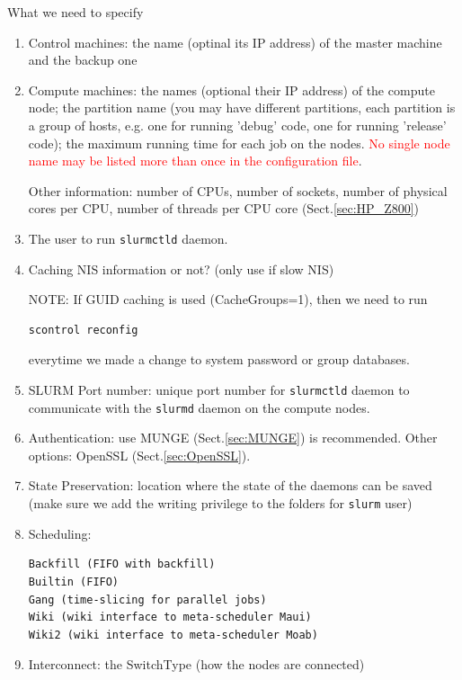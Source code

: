 What we need to specify
\begin{enumerate}
  \item Control machines: the name (optinal its IP address) of the master
  machine and the backup one
  
  \item Compute machines: the names (optional their IP address) of the compute
  node; the partition name (you may have different partitions, each partition is
  a group of hosts, e.g. one for running 'debug' code, one for running 'release'
  code); the maximum running time for each job on the nodes. \textcolor{red}{No
  single node name may be listed more than once in the configuration file}.
  
Other information: number of CPUs, number of sockets, number of physical cores
per CPU, number of threads per CPU core (Sect.\ref{sec:HP_Z800})

  \item The user to run \verb!slurmctld! daemon. 
  
  \item Caching NIS information or not? (only use if slow NIS)

NOTE: If GUID caching is used (CacheGroups=1), then we need to run
\begin{verbatim}
scontrol reconfig
\end{verbatim}
everytime we made a change to system password or group databases. 
  
  \item SLURM Port number: unique port number for \verb!slurmctld! daemon to
  communicate with the \verb!slurmd! daemon on the compute nodes.
  
  \item Authentication: use MUNGE (Sect.\ref{sec:MUNGE}) is recommended. Other
  options: OpenSSL (Sect.\ref{sec:OpenSSL}).
  
  \item State Preservation: location where the state of the daemons can be saved
  (make sure we add the writing privilege to the folders for \verb!slurm! user)
  
  
  \item Scheduling: 
\begin{verbatim}
Backfill (FIFO with backfill)
Builtin (FIFO)
Gang (time-slicing for parallel jobs)
Wiki (wiki interface to meta-scheduler Maui)
Wiki2 (wiki interface to meta-scheduler Moab)
\end{verbatim}

  \item Interconnect: the SwitchType (how the nodes are connected)
  

\end{enumerate}

